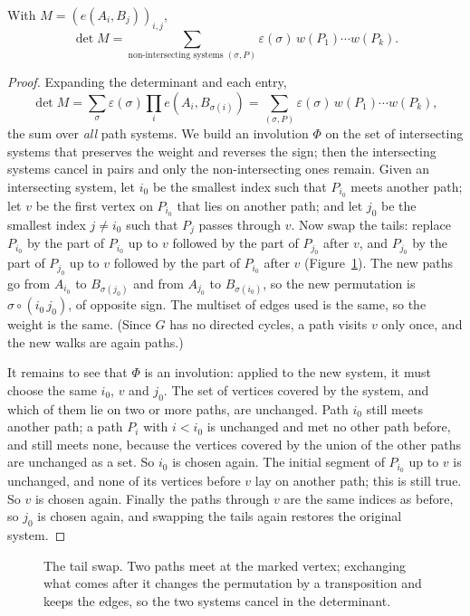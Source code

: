 \begin{theorem}\label{thm:lgv}
With $M=(e(A_i,B_j))_{i,j}$,
\[
\det M=\sum_{\text{non-intersecting systems }(\sigma,P)}\varepsilon(\sigma)\,w(P_1)\cdots w(P_k).
\]
\end{theorem}
\begin{proof}
Expanding the determinant and each entry,
\[
\det M=\sum_\sigma\varepsilon(\sigma)\prod_ie(A_i,B_{\sigma(i)})=\sum_{(\sigma,P)}\varepsilon(\sigma)\,w(P_1)\cdots w(P_k),
\]
the sum over \emph{all} path systems. We build an involution $\Phi$ on the set of intersecting systems that preserves
the weight and reverses the sign; then the intersecting systems cancel in pairs and only the non-intersecting ones
remain. Given an intersecting system, let $i_0$ be the smallest index such that $P_{i_0}$ meets another path; let $v$
be the first vertex on $P_{i_0}$ that lies on another path; and let $j_0$ be the smallest index $j\ne i_0$ such that
$P_j$ passes through $v$. Now swap the tails: replace $P_{i_0}$ by the part of $P_{i_0}$ up to $v$ followed by the part
of $P_{j_0}$ after $v$, and $P_{j_0}$ by the part of $P_{j_0}$ up to $v$ followed by the part of $P_{i_0}$ after $v$
(Figure~\ref{fig:lgv}). The new paths go from $A_{i_0}$ to $B_{\sigma(j_0)}$ and from $A_{j_0}$ to $B_{\sigma(i_0)}$, so the new
permutation is $\sigma\circ(i_0\,j_0)$, of opposite sign. The multiset of edges used is the same, so the weight is the
same. (Since $G$ has no directed cycles, a path visits $v$ only once, and the new walks are again paths.)

It remains to see that $\Phi$ is an involution: applied to the new system, it must choose the same $i_0$, $v$ and
$j_0$. The set of vertices covered by the system, and which of them lie on two or more paths, are unchanged. Path
$i_0$ still meets another path; a path $P_i$ with $i<i_0$ is unchanged and met no other path before, and still meets
none, because the vertices covered by the union of the other paths are unchanged as a set. So $i_0$ is chosen again.
The initial segment of $P_{i_0}$ up to $v$ is unchanged, and none of its vertices before $v$ lay on another path; this is
still true. So $v$ is chosen again. Finally the paths through $v$ are the same indices as before, so $j_0$ is chosen
again, and swapping the tails again restores the original system.
\end{proof}

\begin{figure}[ht]
\centering
{}
\caption{The tail swap. Two paths meet at the marked vertex; exchanging what comes after it changes the permutation by a
transposition and keeps the edges, so the two systems cancel in the determinant.}
\label{fig:lgv}
\end{figure}

